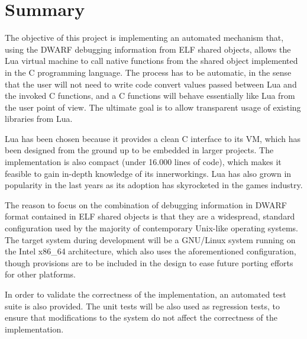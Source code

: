 \chapter*{Summary}

The objective of this project is implementing an automated mechanism that,
using the DWARF debugging information from ELF shared objects, allows the Lua
virtual machine to call native functions from the shared object implemented in
the C programming language. The process has to be automatic, in the sense that
the user will not need to write code convert values passed between Lua and the
invoked C functions, and a C functions will behave essentially like Lua from
the user point of view. The ultimate goal is to allow transparent usage of
existing libraries from Lua.

Lua has been chosen because it provides a clean C interface to its \gls{VM},
which has been designed from the ground up to be embedded in larger projects.
The implementation is also compact (under 16.000 lines of code), which makes
it feasible to gain in-depth knowledge of its innerworkings. Lua has also
grown in popularity in the last years as its adoption has skyrocketed in the
games industry.

The reason to focus on the combination of debugging information in DWARF
format contained in ELF shared objects is that they are a widespread, standard
configuration used by the majority of contemporary Unix-like operating
systems. The target system during development will be a GNU/Linux system
running on the Intel x86\_64 architecture, which also uses the aforementioned
configuration, though provisions are to be included in the design to ease
future porting efforts for other platforms.

In order to validate the correctness of the implementation, an automated test
suite is also provided. The unit tests will be also used as regression tests,
to ensure that modifications to the system do not affect the correctness of
the implementation.

